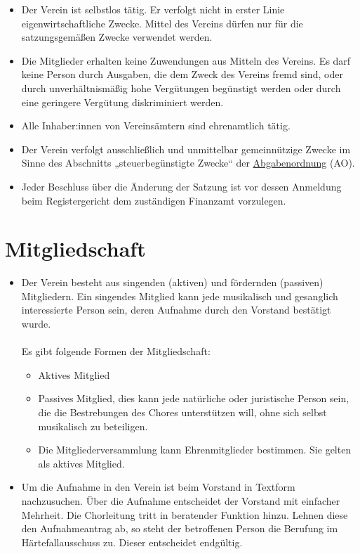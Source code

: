 \documentclass[12pt,paper=a4,ngerman]{report}
\begin{document}
\begin{itemize}
    \item Der Verein ist selbstlos tätig. Er verfolgt nicht in erster Linie eigenwirtschaftliche Zwecke. Mittel des Vereins dürfen nur für die satzungsgemäßen Zwecke verwendet werden.
    \item Die Mitglieder erhalten keine Zuwendungen aus Mitteln des Vereins. Es darf keine Person durch Ausgaben, die dem Zweck des Vereins fremd sind, oder durch unverhältnismäßig hohe Vergütungen begünstigt werden oder durch eine geringere Vergütung diskriminiert werden.
    \item Alle Inhaber:innen von Vereinsämtern sind ehrenamtlich tätig.
    \item Der Verein verfolgt ausschließlich und unmittelbar gemeinnützige Zwecke im Sinne des Abschnitts „steuerbegünstigte Zwecke“ der \href{https://www.gesetze-im-internet.de/ao_1977/__52.html}{Abgabenordnung} (AO).
    \item Jeder Beschluss über die Änderung der Satzung ist vor dessen Anmeldung beim Registergericht dem zuständigen Finanzamt vorzulegen.
\end{itemize}

\section{Mitgliedschaft}

\begin{itemize}
    \item Der Verein besteht aus singenden (aktiven) und fördernden (passiven) Mitgliedern. Ein singendes Mitglied kann jede musikalisch und gesanglich interessierte Person sein, deren Aufnahme durch den Vorstand bestätigt wurde.
    \\
    \\
    Es gibt folgende Formen der Mitgliedschaft:
    \begin{itemize}
        \item Aktives Mitglied
        \item Passives Mitglied, dies kann jede natürliche oder juristische Person sein, die die Bestrebungen des Chores unterstützen will, ohne sich selbst musikalisch zu beteiligen.
        \item Die Mitgliederversammlung kann Ehrenmitglieder bestimmen. Sie gelten als aktives Mitglied.
    \end{itemize}
    \item Um die Aufnahme in den Verein ist beim Vorstand in Textform nachzusuchen. Über die Aufnahme entscheidet der Vorstand mit einfacher Mehrheit. Die Chorleitung tritt in beratender Funktion hinzu. Lehnen diese den Aufnahmeantrag ab, so steht der betroffenen Person die Berufung im Härtefallausschuss zu. Dieser entscheidet endgültig.
\end{itemize}
\end{document}
